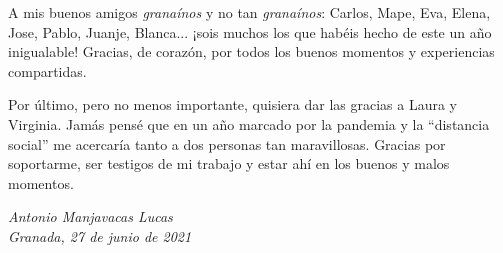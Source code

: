 A mis buenos amigos \textit{granaínos} y no tan \textit{granaínos}: Carlos, Mape, Eva, Elena, Jose, Pablo, Juanje, Blanca... ¡sois muchos los que habéis hecho de este un año inigualable! Gracias, de corazón, por todos los buenos momentos y experiencias compartidas.

Por último, pero no menos importante, quisiera dar las gracias a Laura y Virginia. Jamás pensé que en un año marcado por la pandemia y la ``distancia social'' me acercaría tanto a dos personas tan maravillosas. Gracias por soportarme, ser testigos de mi trabajo y estar ahí en los buenos y malos momentos. 

\begin{flushright}
\textit{Antonio Manjavacas Lucas\\
Granada, 27 de junio de 2021}
\end{flushright}

